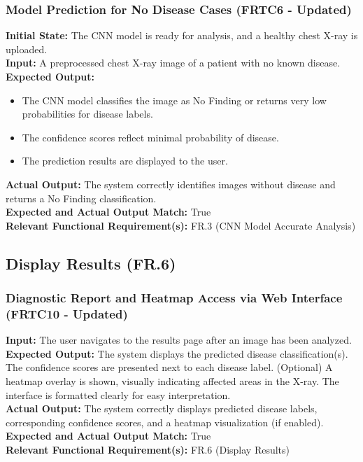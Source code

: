 \documentclass[12pt, titlepage]{article}
\begin{document}
\subsubsection{Model Prediction for No Disease Cases (FRTC6 - Updated)}
\textbf{Initial State:} The CNN model is ready for analysis, and a healthy chest X-ray is uploaded.\\
\textbf{Input:} A preprocessed chest X-ray image of a patient with no known disease.\\
\textbf{Expected Output:}
\begin{itemize}
\item The CNN model classifies the image as No Finding or returns very low probabilities for disease labels.
\item The confidence scores reflect minimal probability of disease.
\item The prediction results are displayed to the user.
\end{itemize}
\textbf{Actual Output:} The system correctly identifies images without disease and returns a No Finding classification.\\
\textbf{Expected and Actual Output Match:} True\\
\textbf{Relevant Functional Requirement(s):} FR.3 (CNN Model Accurate Analysis)\\

\subsection{Display Results (FR.6)}
\subsubsection{Diagnostic Report and Heatmap Access via Web Interface (FRTC10 - Updated)}
\textbf{Input:} The user navigates to the results page after an image has been analyzed.\\
\textbf{Expected Output:} The system displays the predicted disease classification(s). The confidence scores are presented next to each disease label. (Optional) A heatmap overlay is shown, visually indicating affected areas in the X-ray. The interface is formatted clearly for easy interpretation.\\
\textbf{Actual Output:} The system correctly displays predicted disease labels, corresponding confidence scores, and a heatmap visualization (if enabled).\\
\textbf{Expected and Actual Output Match:} True\\
\textbf{Relevant Functional Requirement(s):} FR.6 (Display Results)\\
\end{document}
